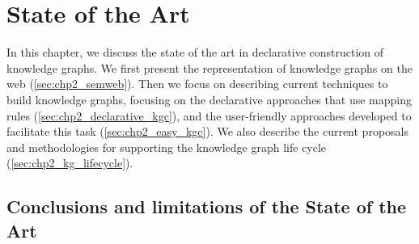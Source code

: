 \chapter{State of the Art}
\label{chapter:sota}

In this chapter, we discuss the state of the art in declarative construction of knowledge graphs. We first present the representation of knowledge graphs on the web (\cref{sec:chp2_semweb}). Then we focus on describing current techniques to build knowledge graphs, focusing on the declarative approaches that use mapping rules (\cref{sec:chp2_declarative_kgc}), and the user-friendly approaches developed to facilitate this task (\cref{sec:chp2_easy_kgc}). We also describe the current proposals and methodologies for supporting the knowledge graph life cycle (\cref{sec:chp2_kg_lifecycle}).











\section{Conclusions and limitations of the State of the Art}